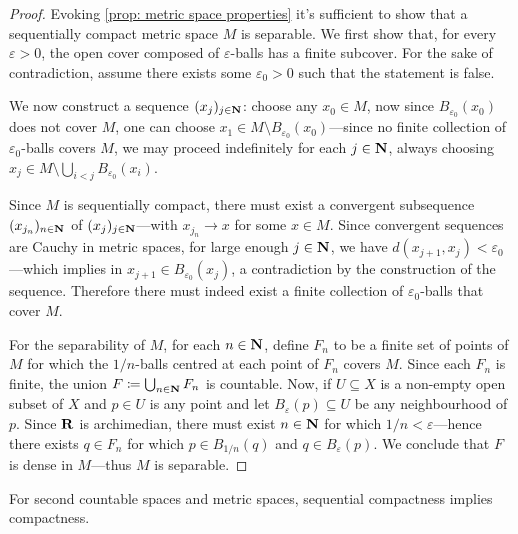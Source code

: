 \begin{proof}
Evoking \cref{prop: metric space properties} it's sufficient to show that a
sequentially compact metric space \(M\) is separable. We first show that, for
every \(\varepsilon > 0\), the open cover composed of \(\varepsilon\)-balls has
a finite subcover. For the sake of contradiction, assume there exists some
\(\varepsilon_0 > 0\) such that the statement is false.

We now construct a sequence \((x_j)_{j \in \mathbf{N}}\): choose any \(x_0 \in M\), now
since \(B_{\varepsilon_0}(x_0)\) does not cover \(M\), one can choose
\(x_1 \in M \setminus B_{\varepsilon_0}(x_0)\)---since no finite collection of
\(\varepsilon_0\)-balls covers \(M\), we may proceed indefinitely for each
\(j \in \mathbf{N}\), always choosing
\(x_j \in M \setminus \bigcup_{i < j} B_{\varepsilon_0}(x_i)\).

Since \(M\) is sequentially compact, there must exist a convergent subsequence
\((x_{j_n})_{n \in \mathbf{N}}\) of \((x_j)_{j \in \mathbf{N}}\)---with \(x_{j_n} \to x\) for
some \(x \in M\). Since convergent sequences are Cauchy in metric spaces, for
large enough \(j \in \mathbf{N}\), we have \(d(x_{j+1}, x_j) < \varepsilon_0\)---which
implies in \(x_{j+1} \in B_{\varepsilon_0}(x_j)\), a contradiction by the
construction of the sequence. Therefore there must indeed exist a finite
collection of \(\varepsilon_0\)-balls that cover \(M\).

For the separability of \(M\), for each \(n \in \mathbf{N}\), define \(F_n\) to be a
finite set of points of \(M\) for which the \(1/n\)-balls centred at each point
of \(F_n\) covers \(M\). Since each \(F_n\) is finite, the union
\(F \coloneq \bigcup_{n \in \mathbf{N}} F_n\) is countable. Now, if \(U \subseteq X\) is
a non-empty open subset of \(X\) and \(p \in U\) is any point and let
\(B_{\varepsilon}(p) \subseteq U\) be any neighbourhood of \(p\). Since \(\mathbf{R}\)
is archimedian, there must exist \(n \in \mathbf{N}\) for which
\(1/n < \varepsilon\)---hence there exists \(q \in F_n\) for which
\(p \in B_{1/n}(q)\) and \(q \in B_{\varepsilon}(p)\). We conclude that \(F\) is
dense in \(M\)---thus \(M\) is separable.
\end{proof}

\begin{proposition}
\label{prop:metric-2nd-ctbl-seq-comp-implies-comp}
For second countable spaces and metric spaces, sequential compactness implies
compactness.
\end{proposition}

